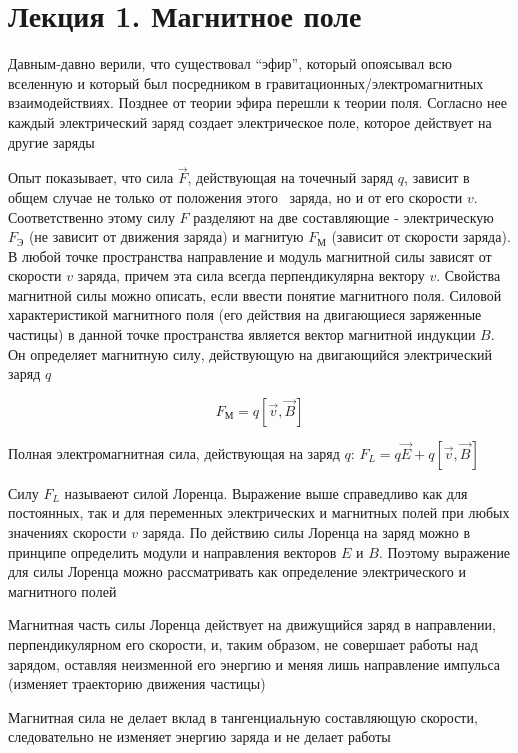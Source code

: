 \documentclass[12pt]{article}
\begin{document}
    \tableofcontents
    \clearpage




\section{Лекция 1. Магнитное поле}

Давным-давно верили, что существовал \enquote{эфир}, который опоясывал всю вселенную и который был посредником в гравитационных/электромагнитных 
взаимодействиях. Позднее от теории эфира перешли к теории поля. Согласно нее каждый электрический заряд создает электрическое поле, 
которое действует на другие заряды

Опыт показывает, что сила $\vec{F}$, действующая на точечный заряд $q$, зависит в общем случае не только от положения этого \
заряда, но и от его скорости $v$. Соответственно этому силу $F$ разделяют на две составляющие - электрическую $F_\text{Э}$ 
(не зависит от движения заряда) и магнитую $F_\text{М}$ (зависит от скорости заряда). В любой точке пространства направление и модуль
магнитной силы зависят от скорости $v$ заряда, причем эта сила всегда перпендикулярна вектору $v$. Свойства магнитной 
силы можно описать, если ввести понятие магнитного поля. Силовой характеристикой магнитного поля (его действия на двигающиеся заряженные частицы)
в данной точке пространства является вектор магнитной индукции $B$. Он определяет магнитную силу, действующую на двигающийся электрический заряд $q$

\[F_\text{М} = q [\vec{v}, \vec{B}]\]

Полная электромагнитная сила, действующая на заряд $q$: $F_L = q\vec{E} + q[\vec{v}, \vec{B}]$

Силу $F_L$ называеют силой Лоренца. Выражение выше справедливо как для постоянных, так и для переменных
электрических и магнитных полей при любых значениях скорости $v$ заряда. По действию силы Лоренца
на заряд можно в принципе определить модули и направления векторов $E$ и $B$. Поэтому выражение для силы Лоренца
можно рассматривать как определение электрического и магнитного полей

Магнитная часть силы Лоренца действует на движущийся заряд в направлении, перпендикулярном его скорости, и,
таким образом, не совершает работы над зарядом, оставляя неизменной его энергию и меняя лишь направление импульса
(изменяет траекторию движения частицы)

Магнитная сила не делает вклад в тангенциальную составляющую скорости, следовательно не изменяет энергию заряда и не делает работы
\end{document}
